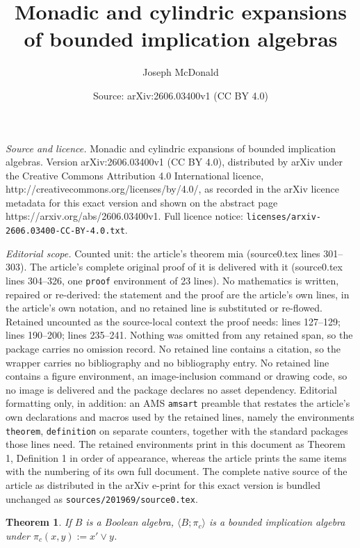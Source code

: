 \documentclass[10pt,a4paper]{amsart}
\title{Monadic and cylindric expansions of bounded implication algebras}
\author{Joseph McDonald}
\date{Source: arXiv:2606.03400v1 (CC BY 4.0)}
\newtheorem{theorem}{Theorem}
\begin{document}
\maketitle

\noindent\emph{Source and licence.} Monadic and cylindric expansions of bounded implication algebras. Version arXiv:2606.03400v1 (CC BY 4.0), distributed by arXiv under the Creative Commons Attribution 4.0 International licence, http://creativecommons.org/licenses/by/4.0/, as recorded in the arXiv licence metadata for this exact version and shown on the abstract page https://arxiv.org/abs/2606.03400v1. Full licence notice: \texttt{licenses/arxiv-2606.03400-CC-BY-4.0.txt}.\par\smallskip

\noindent\textit{Editorial scope.} Counted unit: the article's theorem mia (source0.tex lines 301--303). The article's complete original proof of it is delivered with it (source0.tex lines 304--326, one \texttt{proof} environment of 23 lines). No mathematics is written, repaired or re-derived: the statement and the proof are the article's own lines, in the article's own notation, and no retained line is substituted or re-flowed.  Retained uncounted as the source-local context the proof needs: lines 127--129; lines 190--200; lines 235--241.  Nothing was omitted from any retained span, so the package carries no omission record.  No retained line contains a citation, so the wrapper carries no bibliography and no bibliography entry.  No retained line contains a figure environment, an image-inclusion command or drawing code, so no image is delivered and the package declares no asset dependency.  Editorial formatting only, in addition: an AMS \texttt{amsart} preamble that restates the article's own declarations and macros used by the retained lines, namely the environments \texttt{theorem}, \texttt{definition} on separate counters, together with the standard packages those lines need.  The retained environments print in this document as Theorem 1, Definition 1 in order of appearance, whereas the article prints the same items with the numbering of its own full document.  The complete native source of the article as distributed in the arXiv e-print for this exact version is bundled unchanged as \texttt{sources/201969/source0.tex}.
\begin{theorem}\label{ba to bia}
    If $B$ is a Boolean algebra, $\langle B;\pi_c\rangle$ is a bounded implication algebra under $\pi_c(x,y):=x'\vee y$. 
\end{theorem}
\end{document}
